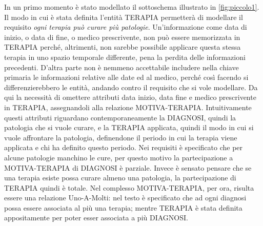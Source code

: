 \documentclass{article}
\begin{document}
In un primo momento è stato modellato il sottoschema illustrato in
\autoref{fig:piccolo1}.  Il modo in cui è stata definita l'entità TERAPIA
permetterà di modellare il requisito \textit{ogni terapia può curare più
patologie}.  Un'informazione come data di inizio, o data di fine, o medico
prescrivente, non può essere memorizzata in TERAPIA perché, altrimenti, non
sarebbe possibile applicare questa stessa terapia in uno spazio temporale
differente, pena la perdita delle informazioni precedenti. D'altra parte non è
nemmeno accettabile includere nella chiave primaria le informazioni relative
alle date ed al medico, perché così facendo si differenzierebbero le entità,
andando contro il requisito che si vole modellare.  Da qui la necessità di
omettere attributi data inizio, data fine e medico prescrivente in TERAPIA,
assegnandoli alla relazione MOTIVA-TERAPIA.  Intuitivamente questi attributi
riguardano contemporaneamente la DIAGNOSI, quindi la patologia che si vuole
curare, e la TERAPIA applicata, quindi il modo in cui si vuole affrontare la
patologia, definendone il periodo in cui la terapia viene applicata e chi ha
definito questo periodo.  Nei requisiti è specificato che per alcune patologie
manchino le cure, per questo motivo la partecipazione a MOTIVA-TERAPIA di
DIAGNOSI è parziale.  Invece è sensato pensare che se una terapia esiste possa
curare almeno una patologia, la partecipazione di TERAPIA quindi è totale.  Nel
complesso MOTIVA-TERAPIA, per ora, risulta essere una relazione Uno-A-Molti:
nel testo è specificato che ad ogni diagnosi possa essere associata al più una
terapia; mentre TERAPIA è stata definita appositamente per poter esser
associata a più DIAGNOSI.
\end{document}
